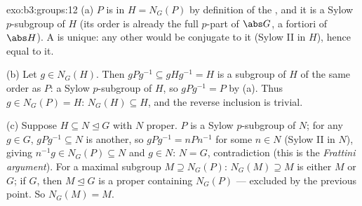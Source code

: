 \begin{solution}{exo:b3:groups:12}
(a) $P$ is  in $H = N_G(P)$ by definition of the
, and it is a Sylow $p$-subgroup of $H$ (its order is
already the full $p$-part of $\abs G$, a fortiori of $\abs H$).
A   is unique: any other would be
conjugate to it (Sylow II in $H$), hence equal to it.

(b) Let $g \in N_G(H)$. Then $gPg^{-1} \subseteq gHg^{-1} = H$
is a subgroup of $H$ of the same order as $P$: a Sylow
$p$-subgroup of $H$, so $gPg^{-1} = P$ by (a). Thus $g \in
N_G(P) = H$: $N_G(H) \subseteq H$, and the reverse inclusion is
trivial.

(c) Suppose $H \subseteq N \trianglelefteq G$ with $N$ proper.
$P$ is a Sylow $p$-subgroup of $N$; for any $g \in G$,
$gPg^{-1} \subseteq N$ is another, so $gPg^{-1} = nPn^{-1}$ for
some $n \in N$ (Sylow II in $N$), giving $n^{-1}g \in N_G(P)
\subseteq N$ and $g \in N$: $N = G$, contradiction (this is the
\emph{Frattini argument}). For a maximal subgroup $M \supseteq
N_G(P)$: $N_G(M) \supseteq M$ is either $M$ or $G$; if $G$,
then $M \trianglelefteq G$ is a proper 
containing $N_G(P)$ --- excluded by the previous point. So
$N_G(M) = M$.
\end{solution}


